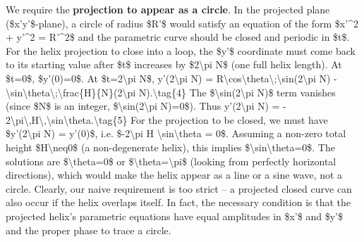 \documentclass[]{article}
\begin{document}
We require the \textbf{projection to appear as a circle}. In the
projected plane (\$x'y'\$-plane), a circle of radius \$R'\$ would
satisfy an equation of the form \$x'\^{}2 + y'\^{}2 = R'\^{}2\$ and the
parametric curve should be closed and periodic in \$t\$. For the helix
projection to close into a loop, the \$y'\$ coordinate must come back to
its starting value after \$t\$ increases by \$2\textbackslash{}pi N\$
(one full helix length). At \$t=0\$, \$y'(0)=0\$. At
\$t=2\textbackslash{}pi N\$, y'(2\textbackslash{}pi N) =
R\textbackslash{}cos\textbackslash{}theta\textbackslash{};\textbackslash{}sin(2\textbackslash{}pi
N) -
\textbackslash{}sin\textbackslash{}theta\textbackslash{};\textbackslash{}frac\{H\}\{N\}(2\textbackslash{}pi
N).\textbackslash{}tag\{4\} The
\$\textbackslash{}sin(2\textbackslash{}pi N)\$ term vanishes (since
\$N\$ is an integer, \$\textbackslash{}sin(2\textbackslash{}pi N)=0\$).
Thus y'(2\textbackslash{}pi N) = -
2\textbackslash{}pi\textbackslash{},H\textbackslash{},\textbackslash{}sin\textbackslash{}theta.\textbackslash{}tag\{5\}
For the projection to be closed, we must have \$y'(2\textbackslash{}pi
N) = y'(0)\$, i.e. \$-2\textbackslash{}pi H
\textbackslash{}sin\textbackslash{}theta = 0\$. Assuming a non-zero
total height \$H\textbackslash{}neq0\$ (a non-degenerate helix), this
implies \$\textbackslash{}sin\textbackslash{}theta=0\$. The solutions
are \$\textbackslash{}theta=0\$ or
\$\textbackslash{}theta=\textbackslash{}pi\$ (looking from perfectly
horizontal directions), which would make the helix appear as a line or a
sine wave, not a circle. Clearly, our naive requirement is too strict --
a projected closed curve can also occur if the helix overlaps itself. In
fact, the necessary condition is that the projected helix's parametric
equations have equal amplitudes in \$x'\$ and \$y'\$ and the proper
phase to trace a circle.
\end{document}
